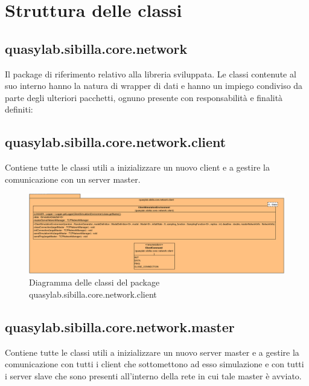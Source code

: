 

\section{Struttura delle classi}

\subsection{quasylab.sibilla.core.network}
Il package di riferimento relativo alla libreria sviluppata. Le classi contenute al suo interno hanno la natura di wrapper di dati e hanno un impiego condiviso da parte degli ulteriori pacchetti, ognuno presente con responsabilità e finalità definiti:

\subsection{quasylab.sibilla.core.network.client} Contiene tutte le classi utili a inizializzare un nuovo client e a gestire la comunicazione con un server master.

\begin{figure}[H]
    \includegraphics[width=\linewidth]{images/quasylab.sibilla.core.network.client.png}
    \captionsetup{justification=centering}
    \caption{Diagramma delle classi del package quasylab.sibilla.core.network.client}
  \end{figure}

\subsection{quasylab.sibilla.core.network.master} Contiene tutte le classi utili a inizializzare un nuovo server master e a gestire la comunicazione con tutti i client che sottomettono ad esso simulazione e con tutti i server slave che sono presenti all’interno della rete in cui tale master è avviato.

